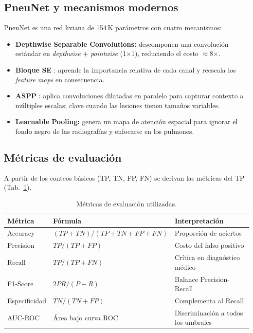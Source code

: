 \documentclass[1p,12pt]{elsarticle}
\begin{document}
\subsection{PneuNet y mecanismos modernos}

PneuNet \cite{saranyaraj2025} es una red liviana de 154\,K parámetros con cuatro mecanismos:
\begin{itemize}[noitemsep]
  \item \textbf{Depthwise Separable Convolutions:} descomponen una convolución estándar en \textit{depthwise} + \textit{pointwise} (1$\times$1), reduciendo el costo $\approx$8$\times$.
  \item \textbf{Bloque SE} \cite{hu2018}: aprende la importancia relativa de cada canal y reescala los \textit{feature maps} en consecuencia.
  \item \textbf{ASPP} \cite{chen2017}: aplica convoluciones dilatadas en paralelo para capturar contexto a múltiples escalas; clave cuando las lesiones tienen tamaños variables.
  \item \textbf{Learnable Pooling:} genera un mapa de atención espacial para ignorar el fondo negro de las radiografías y enfocarse en los pulmones.
\end{itemize}

\subsection{Métricas de evaluación}

A partir de los conteos básicos (TP, TN, FP, FN) se derivan las métricas del TP (Tab.~\ref{tab:metricas_def}).

\begin{table}[h]
\centering
\caption{Métricas de evaluación utilizadas.}
\label{tab:metricas_def}
\begin{tabular}{lll}
\hline
\textbf{Métrica} & \textbf{Fórmula} & \textbf{Interpretación} \\
\hline
Accuracy       & $(TP+TN)/(TP+TN+FP+FN)$ & Proporción de aciertos \\
Precision      & $TP/(TP+FP)$             & Costo del falso positivo \\
Recall         & $TP/(TP+FN)$             & Crítica en diagnóstico médico \\
F1-Score       & $2PR/(P+R)$              & Balance Precision-Recall \\
Especificidad  & $TN/(TN+FP)$             & Complementa al Recall \\
AUC-ROC        & Área bajo curva ROC      & Discriminación a todos los umbrales \\
\hline
\end{tabular}
\end{table}
\end{document}

